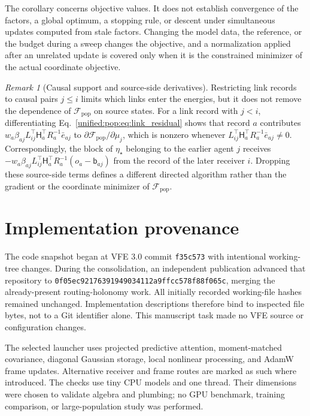 \documentclass[11pt]{article}
\theoremstyle{definition}
\theoremstyle{remark}
\newtheorem{remark}[theorem]{Remark}
\providecommand{\F}{\mathcal{F}}
\begin{document}
The corollary concerns objective values. It does not establish convergence of the factors, a global optimum, a stopping rule, or descent under simultaneous updates computed from stale factors. Changing the model data, the reference, or the budget during a sweep changes the objective, and a normalization applied after an unrelated update is covered only when it is the constrained minimizer of the actual coordinate objective.

\begin{remark}[Causal support and source-side derivatives]
\label{unified:pop:rem:causal}
Restricting link records to causal pairs $j\le i$ limits which links enter the energies, but it does not remove the dependence of $\F_{\mathrm{pop}}$ on source states. For a link record with $j<i$, differentiating Eq.~\eqref{unified:pop:eq:link_residual} shows that record $a$ contributes $w_a\beta_{aj}L_{ij}^\top\mathsf H_a^\top R_a^{-1}\bar e_{aj}$ to $\partial\F_{\mathrm{pop}}/\partial\mu_j$, which is nonzero whenever $L_{ij}^\top\mathsf H_a^\top R_a^{-1}\bar e_{aj}\ne0$. Correspondingly, the block of $\eta_\star$ belonging to the earlier agent $j$ receives $-w_a\beta_{aj}L_{ij}^\top\mathsf H_a^\top R_a^{-1}(o_a-\mathsf b_{aj})$ from the record of the later receiver $i$. Dropping these source-side terms defines a different directed algorithm rather than the gradient or the coordinate minimizer of $\F_{\mathrm{pop}}$.
\end{remark}

\section{Implementation provenance}
\label{unified:provenance}
The code snapshot began at VFE 3.0 commit \texttt{f35c573} with intentional working-tree changes. During the consolidation, an independent publication advanced that repository to \texttt{0f05ec92176391949034112a9ffcc578f88f065c}, merging the already-present routing-holonomy work. All initially recorded working-file hashes remained unchanged. Implementation descriptions therefore bind to inspected file bytes, not to a Git identifier alone. This manuscript task made no VFE source or configuration changes.

The selected launcher uses projected predictive attention, moment-matched covariance, diagonal Gaussian storage, local nonlinear processing, and AdamW frame updates. Alternative receiver and frame routes are marked as such where introduced. The checks use tiny CPU models and one thread. Their dimensions were chosen to validate algebra and plumbing; no GPU benchmark, training comparison, or large-population study was performed.
\end{document}
